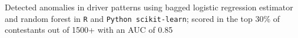 \documentclass[]{deedy-resume-openfont}
\begin{document}
\sectionsep




\begin{tightemize}

\item Detected anomalies in driver patterns using bagged logistic regression estimator and random forest in \verb|R| and \verb|Python scikit-learn|; scored in the top 30\% of contestants out of 1500+ with an AUC of 0.85


\end{tightemize}
\end{document}
